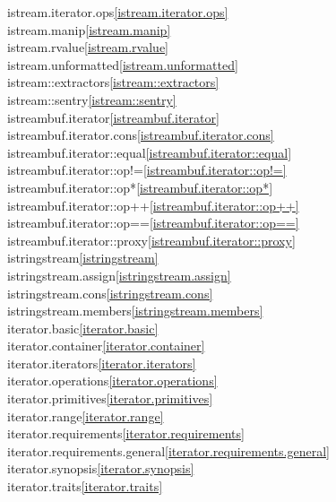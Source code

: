\begin{multicols}{2}
istream.iterator.ops\quad\ref{istream.iterator.ops}\\
istream.manip\quad\ref{istream.manip}\\
istream.rvalue\quad\ref{istream.rvalue}\\
istream.unformatted\quad\ref{istream.unformatted}\\
istream::extractors\quad\ref{istream::extractors}\\
istream::sentry\quad\ref{istream::sentry}\\
istreambuf.iterator\quad\ref{istreambuf.iterator}\\
istreambuf.iterator.cons\quad\ref{istreambuf.iterator.cons}\\
istreambuf.iterator::equal\quad\ref{istreambuf.iterator::equal}\\
istreambuf.iterator::op!=\quad\ref{istreambuf.iterator::op!=}\\
istreambuf.iterator::op*\quad\ref{istreambuf.iterator::op*}\\
istreambuf.iterator::op++\quad\ref{istreambuf.iterator::op++}\\
istreambuf.iterator::op==\quad\ref{istreambuf.iterator::op==}\\
istreambuf.iterator::proxy\quad\ref{istreambuf.iterator::proxy}\\
istringstream\quad\ref{istringstream}\\
istringstream.assign\quad\ref{istringstream.assign}\\
istringstream.cons\quad\ref{istringstream.cons}\\
istringstream.members\quad\ref{istringstream.members}\\
iterator.basic\quad\ref{iterator.basic}\\
iterator.container\quad\ref{iterator.container}\\
iterator.iterators\quad\ref{iterator.iterators}\\
iterator.operations\quad\ref{iterator.operations}\\
iterator.primitives\quad\ref{iterator.primitives}\\
iterator.range\quad\ref{iterator.range}\\
iterator.requirements\quad\ref{iterator.requirements}\\
iterator.requirements.general\quad\ref{iterator.requirements.general}\\
iterator.synopsis\quad\ref{iterator.synopsis}\\
iterator.traits\quad\ref{iterator.traits}\\

\end{multicols}
